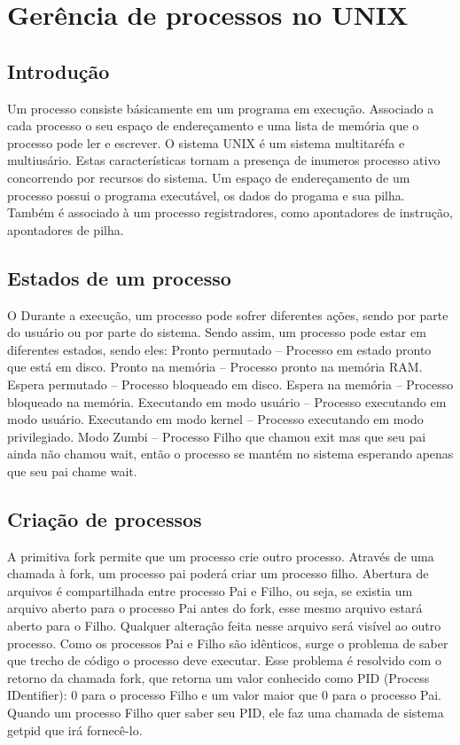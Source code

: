 \chapter{Gerência de processos no UNIX}

\section{Introdução}
Um processo consiste básicamente em um programa em execução. Associado a cada processo o seu espaço de endereçamento e uma lista de memória que o processo pode ler e escrever.
O sistema UNIX é um sistema multitaréfa e multiusário. Estas características tornam a presença de inumeros processo ativo concorrendo por recursos do sistema. Um espaço de endereçamento de um processo possui o programa executável, os dados do progama e sua pilha. Também é associado à um processo registradores, como apontadores de instrução, apontadores de pilha.

\section{Estados de um processo}
O Durante a execução, um processo pode sofrer diferentes ações, sendo por parte do usuário ou por parte do sistema. Sendo assim, um processo pode estar em diferentes estados, sendo eles:
	Pronto permutado – Processo em estado pronto que está em disco.
    Pronto na memória – Processo pronto na memória RAM.
    Espera permutado – Processo bloqueado em disco.
    Espera na memória – Processo bloqueado na memória.
    Executando em modo usuário – Processo executando em modo usuário.
    Executando em modo kernel – Processo executando em modo privilegiado.
   Modo Zumbi – Processo Filho que chamou exit mas que seu pai ainda não chamou wait, então o processo se mantém no sistema esperando apenas que seu pai chame wait.

\section{Criação de processos}
A primitiva fork permite que um processo crie outro processo. Através de uma chamada à fork, um processo pai poderá criar um processo filho.
Abertura de arquivos é compartilhada entre processo Pai e Filho, ou seja, se existia um arquivo aberto para o processo Pai antes do fork, esse mesmo arquivo estará aberto para o Filho. Qualquer alteração feita nesse arquivo será visível ao outro processo.
Como os processos Pai e Filho são idênticos, surge o problema de saber que trecho de código o processo deve executar. Esse problema é resolvido com o retorno da chamada fork, que retorna um valor conhecido como PID (Process IDentifier): 0 para o processo Filho e um valor maior que 0 para o processo Pai.
Quando um processo Filho quer saber seu PID, ele faz uma chamada de sistema getpid que irá fornecê-lo. 


